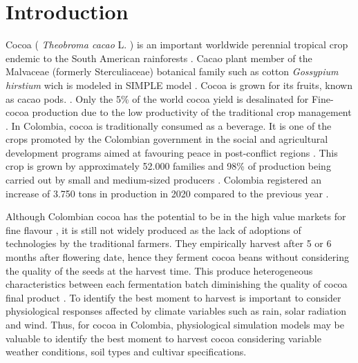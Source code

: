 \documentclass[gene,journal,article,submit,moreauthors,pdftex]{Definitions/mdpi}
\begin{document}

\section{Introduction}
Cocoa ( \textit{Theobroma cacao }L. ) is an important worldwide perennial tropical crop endemic to the South American rainforests \citep{zuidema2005, motamayor2002, argout2011, Rodriguez2019}. Cacao plant member of the Malvaceae (formerly Sterculiaceae)  botanical family such as  cotton \textit{ Gossypium hirstium} \citep{Nix2017cotton} wich is modeled in SIMPLE model \citep{Zao2019simple}. Cocoa is grown for its fruits, known as cacao pods.  \citep{ Niemenak2010, suarez2021}. Only the 5\% of the world cocoa yield is desalinated for Fine-cocoa production due to the low productivity of  the traditional crop management \citep{argout2011}.  In Colombia, cocoa  is  traditionally  consumed  as  a  beverage. It is one of the crops promoted by the Colombian government in the social and agricultural development  programs aimed at favouring peace in post-conflict regions \citep{Rodriguez2019, Abbott2019}. This crop is grown by approximately 52.000 families \citep{Gutierrez2020} and 98\% of production being carried out by small and medium-sized producers \citep{Garcia2014, Escobar2020}. Colombia registered an increase of 3.750 tons in production in 2020 compared to the previous year \citep{lamos2020}. 

Although Colombian cocoa has the potential to be in the high value markets for fine flavour \citep{Escobar2020}, it is still not widely produced as the lack of adoptions of technologies by the traditional farmers. They empirically harvest after 5 or 6 months after flowering date, hence they ferment cocoa beans without considering the  quality of the seeds at the harvest time. This produce heterogeneous characteristics between each fermentation batch diminishing the quality of cocoa final product \citep{Escobar2021}. To identify the best moment to harvest is important to consider physiological responses affected by climate variables such as rain, solar radiation and wind.  Thus,  for cocoa in Colombia, physiological simulation models may be valuable to identify the best moment to harvest cocoa considering variable weather conditions, soil types and cultivar specifications. 
\end{document}
